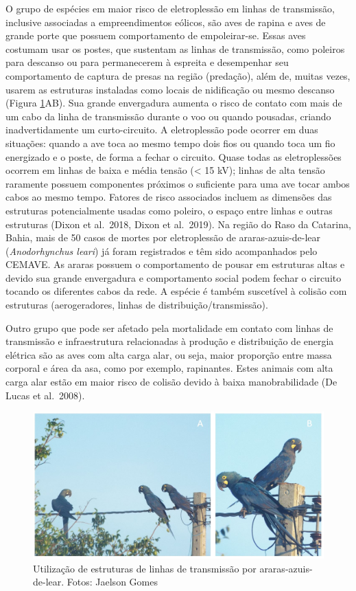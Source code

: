 \documentclass[
  oneside]{scrbook}
\begin{document}
O grupo de espécies em maior risco de eletroplessão em linhas de transmissão, inclusive associadas a empreendimentos eólicos, são aves de rapina e aves de grande porte que possuem comportamento de empoleirar-se. Essas aves costumam usar os postes, que sustentam as linhas de transmissão, como poleiros para descanso ou para permanecerem à espreita e desempenhar seu comportamento de captura de presas na região (predação), além de, muitas vezes, usarem as estruturas instaladas como locais de nidificação ou mesmo descanso (Figura \ref{fig:15}AB). Sua grande envergadura aumenta o risco de contato com mais de um cabo da linha de transmissão durante o voo ou quando pousadas, criando inadvertidamente um curto-circuito. A eletroplessão pode ocorrer em duas situações: quando a ave toca ao mesmo tempo dois fios ou quando toca um fio energizado e o poste, de forma a fechar o circuito. Quase todas as eletroplessões ocorrem em linhas de baixa e média tensão (\textless{} 15 kV); linhas de alta tensão raramente possuem componentes próximos o suficiente para uma ave tocar ambos cabos ao mesmo tempo. Fatores de risco associados incluem as dimensões das estruturas potencialmente usadas como poleiro, o espaço entre linhas e outras estruturas (Dixon et al.~2018, Dixon et al.~2019). Na região do Raso da Catarina, Bahia, mais de 50 casos de mortes por eletroplessão de araras-azuis-de-lear (\emph{Anodorhynchus leari}) já foram registrados e têm sido acompanhados pelo CEMAVE. As araras possuem o comportamento de pousar em estruturas altas e devido sua grande envergadura e comportamento social podem fechar o circuito tocando os diferentes cabos da rede. A espécie é também suscetível à colisão com estruturas (aerogeradores, linhas de distribuição/transmissão).

Outro grupo que pode ser afetado pela mortalidade em contato com linhas de transmissão e infraestrutura relacionadas à produção e distribuição de energia elétrica são as aves com alta carga alar, ou seja, maior proporção entre massa corporal e área da asa, como por exemplo, rapinantes. Estes animais com alta carga alar estão em maior risco de colisão devido à baixa manobrabilidade (De Lucas et al.~2008).

\begin{figure}[H]

{\centering \includegraphics[width=0.75\linewidth]{imagens/cap04/Figura_4.4ab} 

}

\caption{Utilização de estruturas de linhas de transmissão por araras-azuis-de-lear. Fotos: Jaelson Gomes}\label{fig:15}
\end{figure}
\end{document}
